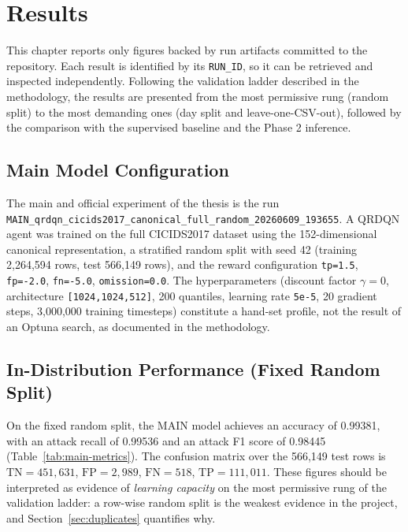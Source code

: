 \chapter{Results}

This chapter reports only figures backed by run artifacts committed to the repository. Each result is identified by its \texttt{RUN\_ID}, so it can be retrieved and inspected independently. Following the validation ladder described in the methodology, the results are presented from the most permissive rung (random split) to the most demanding ones (day split and leave-one-CSV-out), followed by the comparison with the supervised baseline and the Phase 2 inference.

\section{Main Model Configuration}
The main and official experiment of the thesis is the run \texttt{MAIN\_qrdqn\_cicids2017\_canonical\_full\_random\_20260609\_193655}. A QRDQN agent was trained on the full CICIDS2017 dataset using the 152-dimensional canonical representation, a stratified random split with seed 42 (training 2,264,594 rows, test 566,149 rows), and the reward configuration \texttt{tp=1.5}, \texttt{fp=-2.0}, \texttt{fn=-5.0}, \texttt{omission=0.0}. The hyperparameters (discount factor $\gamma = 0$, architecture \texttt{[1024,1024,512]}, 200 quantiles, learning rate \texttt{5e-5}, 20 gradient steps, 3,000,000 training timesteps) constitute a hand-set profile, not the result of an Optuna search, as documented in the methodology.

\section{In-Distribution Performance (Fixed Random Split)}
On the fixed random split, the MAIN model achieves an accuracy of 0.99381, with an attack recall of 0.99536 and an attack F1 score of 0.98445 (Table~\ref{tab:main-metrics}). The confusion matrix over the 566,149 test rows is $\mathrm{TN}=451{,}631$, $\mathrm{FP}=2{,}989$, $\mathrm{FN}=518$, $\mathrm{TP}=111{,}011$. These figures should be interpreted as evidence of \emph{learning capacity} on the most permissive rung of the validation ladder: a row-wise random split is the weakest evidence in the project, and Section~\ref{sec:duplicates} quantifies why.

